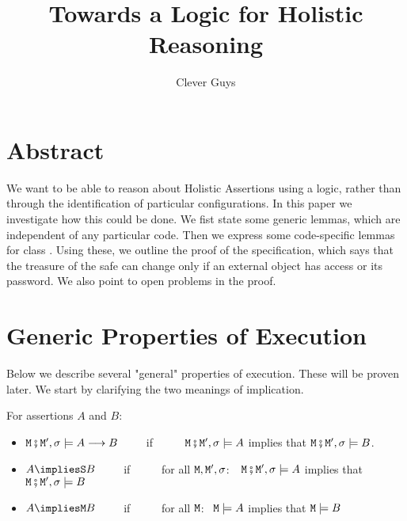 \documentclass[acmsmall,screen,anonymous,review]{acmart}
\begin{document}
\title{Towards a Logic for Holistic Reasoning}
 
\author{Clever Guys}

 
\maketitle

 

\section{Abstract}
We want to be able to reason about Holistic Assertions using a logic, rather than through the identification of particular 
configurations. 
In this paper we investigate how this could be done. We fist state some generic lemmas, which are independent of any particular code.
Then we express some code-specific lemmas for class . Using these, we outline the proof of 
the specification, which says that the treasure of the safe can change only if an external object has access or its password.
We also point to open problems in the proof.

\section{Generic Properties of Execution}

Below we describe several "general" properties of execution. These will be proven later. %
We start by clarifying the two meanings of implication. 

\begin{definition}
For assertions $A$ and $B$: %
\begin{itemize}
\item
${\mbox{\tt{\ensuremath{{\mbox{\tt{M}}}}}}}\fatsemi {\mbox{\tt{\ensuremath{{\mbox{\tt{M}}}}}}}', \sigma \models A \longrightarrow B$\  \ \ \ \ if \ \  \ \ \ ${\mbox{\tt{\ensuremath{{\mbox{\tt{M}}}}}}}\fatsemi {\mbox{\tt{\ensuremath{{\mbox{\tt{M}}}}}}}', \sigma \models A $ 
implies that ${\mbox{\tt{\ensuremath{{\mbox{\tt{M}}}}}}}\fatsemi {\mbox{\tt{\ensuremath{{\mbox{\tt{M}}}}}}}', \sigma \models  B$.
\item
$A \impliesS B$\  \ \ \ \ if \ \  \ \ \ for all $ {\mbox{\tt{\ensuremath{{\mbox{\tt{M}}}}}}},{\mbox{\tt{\ensuremath{{\mbox{\tt{M}}}}}}}',\sigma$:\  \ ${\mbox{\tt{\ensuremath{{\mbox{\tt{M}}}}}}}\fatsemi {\mbox{\tt{\ensuremath{{\mbox{\tt{M}}}}}}}', \sigma \models A $ 
implies that ${\mbox{\tt{\ensuremath{{\mbox{\tt{M}}}}}}}\fatsemi {\mbox{\tt{\ensuremath{{\mbox{\tt{M}}}}}}}', \sigma \models  B$
\item
$A \impliesM B$\  \ \ \ \ if \ \  \ \ \  for all $ {\mbox{\tt{\ensuremath{{\mbox{\tt{M}}}}}}}$: \ ${\mbox{\tt{\ensuremath{{\mbox{\tt{M}}}}}}} \models A $ 
implies that ${\mbox{\tt{\ensuremath{{\mbox{\tt{M}}}}}}}  \models  B$
\end{itemize}


\end{definition}
\end{document}
